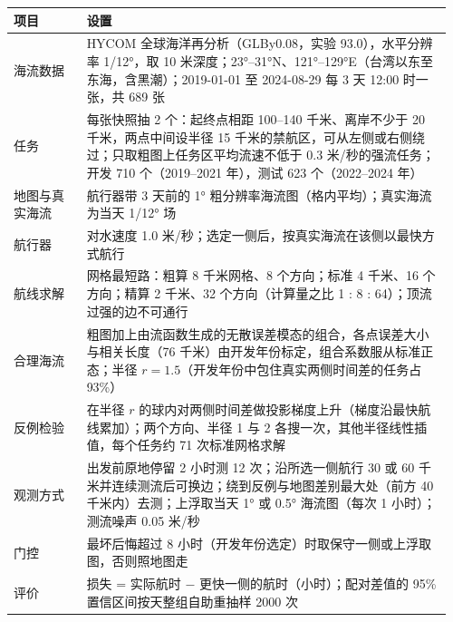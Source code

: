 \begin{tabular}{@{}p{0.16\linewidth}p{0.80\linewidth}@{}}
\toprule
项目 & 设置 \\
\midrule
海流数据 & HYCOM 全球海洋再分析（GLBy0.08，实验 93.0），水平分辨率 1/12°，取 10 米深度；23°--31°N、121°--129°E（台湾以东至东海，含黑潮）；2019-01-01 至 2024-08-29 每 3 天 12:00 时一张，共 689 张 \\
任务 & 每张快照抽 2 个：起终点相距 100--140 千米、离岸不少于 20 千米，两点中间设半径 15 千米的禁航区，可从左侧或右侧绕过；只取粗图上任务区平均流速不低于 0.3 米/秒的强流任务；开发 710 个（2019--2021 年），测试 623 个（2022--2024 年） \\
地图与真实海流 & 航行器带 3 天前的 1° 粗分辨率海流图（格内平均）；真实海流为当天 1/12° 场 \\
航行器 & 对水速度 1.0 米/秒；选定一侧后，按真实海流在该侧以最快方式航行 \\
航线求解 & 网格最短路：粗算 8 千米网格、8 个方向；标准 4 千米、16 个方向；精算 2 千米、32 个方向（计算量之比 1 : 8 : 64）；顶流过强的边不可通行 \\
合理海流 & 粗图加上由流函数生成的无散误差模态的组合，各点误差大小与相关长度（76 千米）由开发年份标定，组合系数服从标准正态；半径 $r=1.5$（开发年份中包住真实两侧时间差的任务占 93\%） \\
反例检验 & 在半径 $r$ 的球内对两侧时间差做投影梯度上升（梯度沿最快航线累加）；两个方向、半径 1 与 2 各搜一次，其他半径线性插值，每个任务约 71 次标准网格求解 \\
观测方式 & 出发前原地停留 2 小时测 12 次；沿所选一侧航行 30 或 60 千米并连续测流后可换边；绕到反例与地图差别最大处（前方 40 千米内）去测；上浮取当天 1° 或 0.5° 海流图（每次 1 小时）；测流噪声 0.05 米/秒 \\
门控 & 最坏后悔超过 8 小时（开发年份选定）时取保守一侧或上浮取图，否则照地图走 \\
评价 & 损失 = 实际航时 $-$ 更快一侧的航时（小时）；配对差值的 95\% 置信区间按天整组自助重抽样 2000 次 \\
\bottomrule
\end{tabular}
